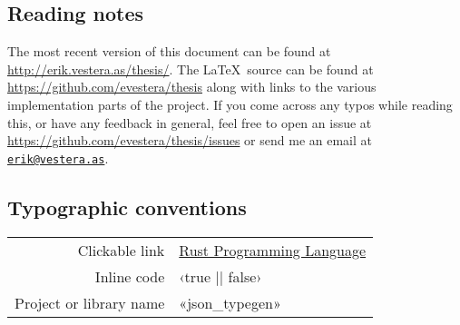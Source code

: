 
\vspace*{2cm}

\begin{center}

\section*{\hfil Reading notes \hfil}

The most recent version of this document can be found at \url{http://erik.vestera.as/thesis/}. The \LaTeX\ source can be found at \url{https://github.com/evestera/thesis} along with links to the various implementation parts of the project. If you come across any typos while reading this, or have any feedback in general, feel free to open an issue at \url{https://github.com/evestera/thesis/issues} or send me an email at \href{mailto:erik@vestera.as}{\nolinkurl{erik@vestera.as}}.

\subsection*{\hfil Typographic conventions \hfil}

\begin{tabular}{ r l }
Clickable link & \href{https://www.rust-lang.org/}{Rust Programming Language} \\
Inline code & ‹true || false› \\
Project or library name & «json_typegen» \\
\end{tabular}

\end{center}
